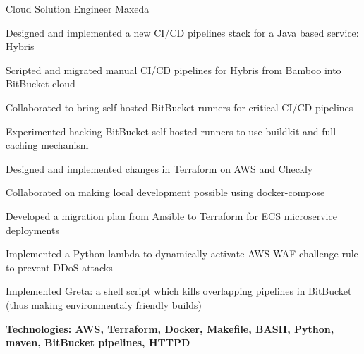 \begin{cventries}
\hfill\begin{minipage}{\dimexpr\textwidth-1cm}
\xdef\tpd{\the\prevdepth}
\begin{cventrystack}
	\cventry
	{Cloud Solution Engineer} %
	{Maxeda} %
	{}
	{}
	{
		\begin{cvitems}
			\item {Designed and implemented a new CI/CD pipelines stack for a Java based service: Hybris}
			\item {Scripted and migrated manual CI/CD pipelines for Hybris from Bamboo into BitBucket cloud}
			\item {Collaborated to bring self-hosted BitBucket runners for critical CI/CD pipelines}
			\item {Experimented hacking BitBucket self-hosted runners to use buildkit and full caching mechanism}
			\item {Designed and implemented changes in Terraform on AWS and Checkly}
			\item {Collaborated on making local development possible using docker-compose}
			\item {Developed a migration plan from Ansible to Terraform for ECS microservice deployments}
			\item {Implemented a Python lambda to dynamically activate AWS WAF challenge rule to prevent DDoS attacks}
			\item {Implemented Greta: a shell script which kills overlapping pipelines in BitBucket (thus making environmentaly friendly builds)}
			\item {\bfseries{Technologies:} AWS, Terraform, Docker, Makefile, BASH, Python, maven, BitBucket pipelines, HTTPD}
		\end{cvitems}
	}
\end{cventrystack}
\end{minipage}


\end{cventries}
